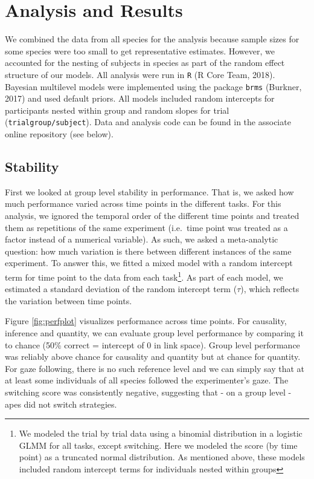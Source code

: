 \documentclass[10pt, letterpaper]{article}
\begin{document}
\hypertarget{analysis-and-results}{%
\section{Analysis and Results}\label{analysis-and-results}}

We combined the data from all species for the analysis because sample
sizes for some species were too small to get representative estimates.
However, we accounted for the nesting of subjects in species as part of
the random effect structure of our models. All analysis were run in
\texttt{R} (R Core Team, 2018). Bayesian multilevel models were
implemented using the package \texttt{brms} (Burkner, 2017) and used
default priors. All models included random intercepts for participants
nested within group and random slopes for trial
(\texttt{trial\textbar{}group/subject}). Data and analysis code can be
found in the associate online repository (see below).

\hypertarget{stability}{%
\subsection{Stability}\label{stability}}

First we looked at group level stability in performance. That is, we
asked how much performance varied across time points in the different
tasks. For this analysis, we ignored the temporal order of the different
time points and treated them as repetitions of the same experiment
(i.e.~time point was treated as a factor instead of a numerical
variable). As such, we asked a meta-analytic question: how much
variation is there between different instances of the same experiment.
To answer this, we fitted a mixed model with a random intercept term for
time point to the data from each task\footnote{We modeled the trial by
  trial data using a binomial distribution in a logistic GLMM for all
  tasks, except switching. Here we modeled the score (by time point) as
  a truncated normal distribution. As mentioned above, these models
  included random intercept terms for individuals nested within groups}.
As part of each model, we estimated a standard deviation of the random
intercept term (\(\tau\)), which reflects the variation between time
points.

Figure \ref{fig:perfplot} visualizes performance across time points. For
causality, inference and quantity, we can evaluate group level
performance by comparing it to chance (50\% correct = intercept of 0 in
link space). Group level performance was reliably above chance for
causality and quantity but at chance for quantity. For gaze following,
there is no such reference level and we can simply say that at at least
some individuals of all species followed the experimenter's gaze. The
switching score was consistently negative, suggesting that - on a group
level - apes did not switch strategies.
\end{document}
